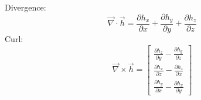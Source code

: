 \newline
Divergence: 
\begin{equation}
	\vec{\nabla} \cdot \vec{h} = \frac{\partial h_{x}}{\partial x} + \frac{\partial h_{y}}{\partial y} + \frac{\partial h_{z}}{\partial z}
\end{equation}
Curl: 
\begin{equation}
\vec{\nabla} \times \vec{h} = 
	\begin{bmatrix} 
		\frac{\partial h_{z}}{\partial y} - \frac{\partial h_{y}}{\partial z}\\
		\frac{\partial h_{x}}{\partial z} - \frac{\partial h_{z}}{\partial x}\\
		\frac{\partial h_{y}}{\partial x} - \frac{\partial h_{x}}{\partial y}
	\end{bmatrix}
\end{equation}
